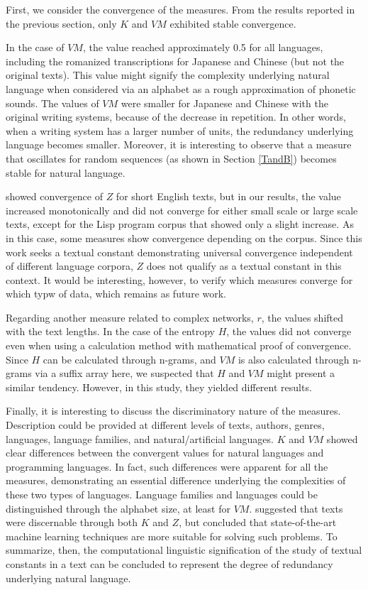 \documentclass[english]{jnlp_1.4_rep}
\begin{document}
First, we consider the convergence of the measures. 
From the results reported in the previous section, only $K$ and $\mathit{VM}$ exhibited stable convergence. 

In the case of $\mathit{VM}$, the value reached approximately 0.5 for all languages, including the romanized 
transcriptions for Japanese and Chinese (but not the original texts). 
This value might signify the complexity underlying natural language 
when considered via an alphabet as a rough approximation of phonetic sounds. 
The values of $\mathit{VM}$ were smaller for Japanese and Chinese with the original writing systems, 
because of the decrease in repetition. In other words, when a writing system has a larger 
number of units, the redundancy underlying language becomes smaller. 
Moreover, it is interesting to observe that a measure that oscillates for random sequences (as shown in Section \ref{TandB}) becomes stable for natural language. 

\cite{BaayenTweedie} showed convergence of $Z$ for short English texts, but in our results, 
the value increased monotonically and did not converge for either small scale or large scale texts, 
except for the Lisp program corpus that showed only a slight increase. As in this case, some measures show convergence depending on the corpus. Since this work seeks a textual constant demonstrating universal convergence independent of different language corpora, $Z$ does not qualify as a textual constant in this context. It would be interesting, however, to verify which measures converge for which typw of data, which remains as future work.

Regarding another measure related to complex networks, $r$, the values shifted with the text lengths. In the case of the entropy $H$, the values did not converge even when using a calculation method with mathematical proof of convergence. Since $H$ can be calculated through n-grams, and $\mathit{VM}$ is also calculated through n-grams via a suffix array here, we suspected that $H$ and $\mathit{VM}$ might present a similar tendency.
However, in this study, they yielded different results. 

Finally, it is interesting to discuss the discriminatory nature of the measures. Description could be provided at different levels of texts, authors, genres, languages, language families, and natural/artificial languages. $K$ and $\mathit{VM}$ showed clear differences 
between the convergent values for natural languages and programming languages. 
In fact, such differences were apparent for all the measures, demonstrating an essential 
difference underlying the complexities of these two types of languages. Language families and 
languages could be distinguished through the alphabet size, at least for $\mathit{VM}$. \cite{BaayenTweedie} suggested 
that texts were discernable through both $K$ and $Z$, 
but concluded that state-of-the-art machine learning techniques are more suitable for solving such problems. 
To summarize, then, the computational linguistic signification of the study of 
textual constants in a text can be concluded to represent the degree of redundancy underlying natural language.
\end{document}
